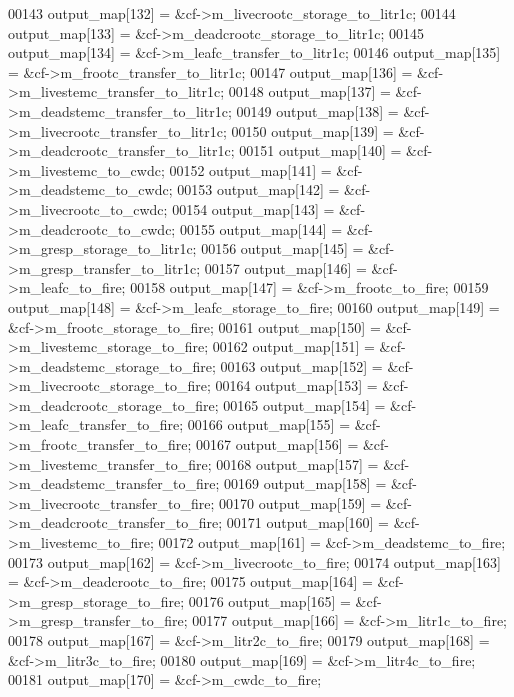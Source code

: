 \begin{DoxyCode}
00143         output\_map[132] = &cf->m\_livecrootc\_storage\_to\_litr1c;
00144         output\_map[133] = &cf->m\_deadcrootc\_storage\_to\_litr1c;
00145         output\_map[134] = &cf->m\_leafc\_transfer\_to\_litr1c;
00146         output\_map[135] = &cf->m\_frootc\_transfer\_to\_litr1c;
00147         output\_map[136] = &cf->m\_livestemc\_transfer\_to\_litr1c;
00148         output\_map[137] = &cf->m\_deadstemc\_transfer\_to\_litr1c;
00149         output\_map[138] = &cf->m\_livecrootc\_transfer\_to\_litr1c;
00150         output\_map[139] = &cf->m\_deadcrootc\_transfer\_to\_litr1c;
00151         output\_map[140] = &cf->m\_livestemc\_to\_cwdc;
00152         output\_map[141] = &cf->m\_deadstemc\_to\_cwdc;
00153         output\_map[142] = &cf->m\_livecrootc\_to\_cwdc;
00154         output\_map[143] = &cf->m\_deadcrootc\_to\_cwdc;
00155         output\_map[144] = &cf->m\_gresp\_storage\_to\_litr1c;
00156         output\_map[145] = &cf->m\_gresp\_transfer\_to\_litr1c;
00157         output\_map[146] = &cf->m\_leafc\_to\_fire;
00158         output\_map[147] = &cf->m\_frootc\_to\_fire;
00159         output\_map[148] = &cf->m\_leafc\_storage\_to\_fire;
00160         output\_map[149] = &cf->m\_frootc\_storage\_to\_fire;
00161         output\_map[150] = &cf->m\_livestemc\_storage\_to\_fire;
00162         output\_map[151] = &cf->m\_deadstemc\_storage\_to\_fire;
00163         output\_map[152] = &cf->m\_livecrootc\_storage\_to\_fire;
00164         output\_map[153] = &cf->m\_deadcrootc\_storage\_to\_fire;
00165         output\_map[154] = &cf->m\_leafc\_transfer\_to\_fire;
00166         output\_map[155] = &cf->m\_frootc\_transfer\_to\_fire;
00167         output\_map[156] = &cf->m\_livestemc\_transfer\_to\_fire;
00168         output\_map[157] = &cf->m\_deadstemc\_transfer\_to\_fire;
00169         output\_map[158] = &cf->m\_livecrootc\_transfer\_to\_fire;
00170         output\_map[159] = &cf->m\_deadcrootc\_transfer\_to\_fire;
00171         output\_map[160] = &cf->m\_livestemc\_to\_fire;
00172         output\_map[161] = &cf->m\_deadstemc\_to\_fire;
00173         output\_map[162] = &cf->m\_livecrootc\_to\_fire;
00174         output\_map[163] = &cf->m\_deadcrootc\_to\_fire;
00175         output\_map[164] = &cf->m\_gresp\_storage\_to\_fire;
00176         output\_map[165] = &cf->m\_gresp\_transfer\_to\_fire;
00177         output\_map[166] = &cf->m\_litr1c\_to\_fire;
00178         output\_map[167] = &cf->m\_litr2c\_to\_fire;
00179         output\_map[168] = &cf->m\_litr3c\_to\_fire;
00180         output\_map[169] = &cf->m\_litr4c\_to\_fire;
00181         output\_map[170] = &cf->m\_cwdc\_to\_fire;

\end{DoxyCode}
